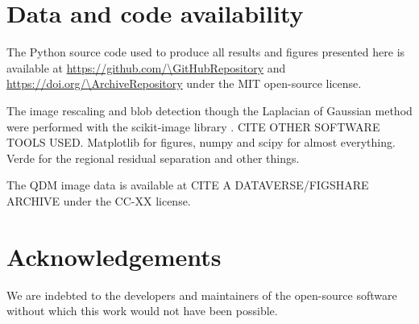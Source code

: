 \section{Data and code availability}

The Python source code used to produce all results and figures presented here
is available at \url{https://github.com/\GitHubRepository} and
\url{https://doi.org/\ArchiveRepository} under the MIT open-source license.

The image rescaling and blob detection though the Laplacian of Gaussian method
were performed with the scikit-image library \citep{VanderWalt2014}. CITE OTHER
SOFTWARE TOOLS USED. Matplotlib for figures, numpy and scipy for almost
everything. Verde for the regional residual separation and other things.

The QDM image data is available at CITE A DATAVERSE/FIGSHARE ARCHIVE under the
CC-XX license.



\section{Acknowledgements}

We are indebted to the developers and maintainers of the open-source software
without which this work would not have been possible.
